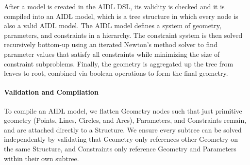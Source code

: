 \iffalse













After a model is created in the AIDL DSL, its validity is checked and it is compiled into an AIDL model, which is a tree structure in which every node is also a valid AIDL model. 
The AIDL model defines a system of geometry, parameters, and constraints in a hierarchy. 
The constraint system is then solved recursively bottom-up using an iterated Newton's method solver to find parameter values that satisfy all constraints while minimizing the size of constraint subproblems. 
Finally, the geometry is aggregated up the tree from leaves-to-root, combined via boolean operations to form the final geometry.

\paragraph{Validation and Compilation}
To compile an AIDL model, we flatten Geometry nodes such that just primitive geometry (Points, Lines, Circles, and Arcs), Parameters, and Constraints remain, and are attached directly to a Structure. 
We ensure every subtree can be solved independently by validating that Geometry only references other Geometry on the same Structure, and Constraints only reference Geometry and Parameters within their own subtree. 

